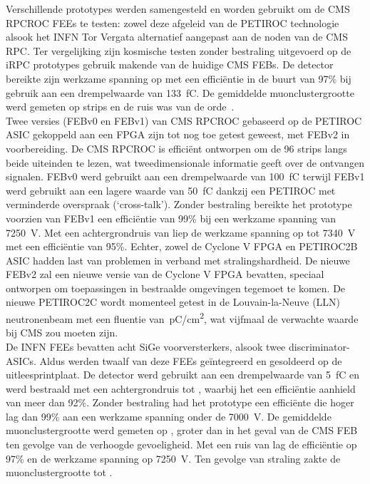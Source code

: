 	Verschillende prototypes werden samengesteld en worden gebruikt om de CMS RPCROC FEEs te testen: zowel deze afgeleid van de PETIROC technologie alsook het INFN Tor Vergata alternatief aangepast aan de noden van de CMS RPC. Ter vergelijking zijn kosmische testen zonder bestraling uitgevoerd op de iRPC prototypes gebruik makende van de huidige CMS FEBs. De detector bereikte zijn werkzame spanning op  met een efficiëntie in de buurt van 97\% bij gebruik aan een drempelwaarde van \SI{133}{fC}. De gemiddelde muonclustergrootte werd gemeten op  strips en de ruis was van de orde \,\sirate.\\
	Twee versies (FEBv0 en FEBv1) van CMS RPCROC gebaseerd op de PETIROC ASIC gekoppeld aan een FPGA zijn tot nog toe getest geweest, met FEBv2 in voorbereiding. De CMS RPCROC is efficiënt ontworpen om de 96 strips langs beide uiteinden te lezen, wat tweedimensionale informatie geeft over de ontvangen signalen. FEBv0 werd gebruikt aan een drempelwaarde van \SI{100}{fC} terwijl FEBv1 werd gebruikt aan een lagere waarde van \SI{50}{fC} dankzij een PETIROC met verminderde overspraak (‘cross-talk’). Zonder bestraling bereikte het prototype voorzien van FEBv1 een efficiëntie van 99\% bij een werkzame spanning van \SI{7250}{V}. Met een achtergrondruis van  liep de werkzame spanning op tot \SI{7340}{V} met een efficiëntie van 95\%. Echter, zowel de Cyclone V FPGA en PETIROC2B ASIC hadden last van problemen in verband met stralingshardheid. De nieuwe FEBv2 zal een nieuwe versie van de Cyclone V FPGA bevatten, speciaal ontworpen om toepassingen in bestraalde omgevingen tegemoet te komen. De nieuwe PETIROC2C wordt momenteel getest in de Louvain-la-Neuve (LLN) neutronenbeam met een fluentie van \,\si{pC/cm^2}, wat vijfmaal de verwachte waarde bij CMS zou moeten zijn.\\
	De INFN FEEs bevatten acht SiGe voorversterkers, alsook twee discriminator-ASICs. Aldus werden twaalf van deze FEEs geïntegreerd en gesoldeerd op de uitleesprintplaat. De detector werd gebruikt aan een drempelwaarde van \SI{5}{fC} en werd bestraald met een achtergrondruis tot , waarbij het een efficiëntie aanhield van meer dan 92\%. Zonder bestraling had het prototype een efficiënte die hoger lag dan 99\% aan een werkzame spanning onder de \SI{7000}{V}. De gemiddelde muonclustergrootte werd gemeten op , groter dan in het geval van de CMS FEB ten gevolge van de verhoogde gevoeligheid. Met een ruis van  lag de efficiëntie op 97\% en de werkzame spanning op \SI{7250}{V}. Ten gevolge van straling zakte de muonclustergrootte tot .\vspace*{5mm}
	
